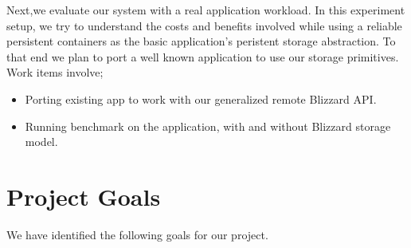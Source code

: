 Next,we evaluate our system with a real application workload. In this experiment setup, we try to understand the costs
and benefits involved while using a reliable persistent containers as the basic application's peristent storage abstraction.
To that end we plan to port a well known application to use our storage primitives. Work items involve;
\begin{itemize}
\item Porting existing app to work with our generalized remote Blizzard API.
\item Running benchmark on the application, with and without Blizzard storage model.
\end{itemize}


\section{Project Goals}
We have identified the following goals for our project.
